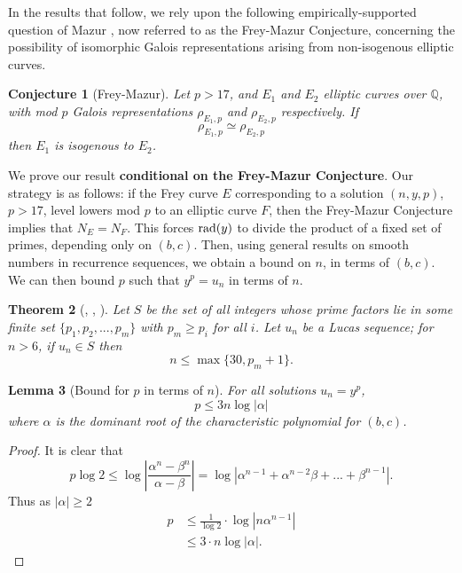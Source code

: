 \documentclass[12pt]{amsart}
\newtheorem{thm}{Theorem}[section]
\newtheorem{lem}[thm]{Lemma}
\newtheorem{conj}[thm]{Conjecture}
\theoremstyle{definition}
\def\Q{{\mathbb Q}}
\newcommand{\rad}{{\rm{rad}}}
\newcommand{\bfrac}[2]{\left| \frac{#1}{#2} \right|}
\begin{document}
In the results that follow, we rely upon the following empirically-supported question of Mazur \cite{mazur78}, now referred to as the Frey-Mazur Conjecture, concerning the possibility of isomorphic Galois representations arising from non-isogenous elliptic curves.

\begin{conj}[Frey-Mazur]\label{FreyMazur}
Let $p > 17$, and $E_1$ and $E_2$ elliptic curves over $\Q$, with mod $p$ Galois representations $\rho_{E_1,p}$ and $\rho_{E_2,p}$ respectively.  If
\[ \rho_{E_1,p} \simeq \rho_{E_2,p} \]
then $E_1$ is isogenous to $E_2$.
\end{conj}

We prove our result \textbf{conditional on the Frey-Mazur Conjecture}. Our strategy is as follows: if the Frey curve $E$ corresponding to a solution $(n,y,p)$, $p > 17$, level lowers mod $p$ to an elliptic curve $F$, then the Frey-Mazur Conjecture implies that $N_E = N_F$. This forces $\rad(y)$ to divide the product of a fixed set of primes, depending only on $(b,c)$. Then, using general results on smooth numbers in recurrence sequences, we obtain a bound on $n$, in terms of $(b,c)$. We can then bound $p$ such that $y^p = u_n$ in terms of $n$.


\begin{thm}[\cite{gyory81}, \cite{gyory82}, \cite{gyory03}]\label{smoothterm}
Let $S$ be the set of all integers whose prime factors lie in some finite set $\{p_1,p_2,...,p_m\}$ with $p_m \geq p_i$ for all $i$.  Let $u_n$ be a Lucas sequence; for $n > 6$, if $u_n \in S$ then
\[ n \leq \max\{30, p_m +1 \}. \]
\end{thm}

\begin{lem}[Bound for $p$ in terms of $n$]\label{boundpintermsn}
For all solutions $u_n = y^p$, 
\[ p \leq 3n \log|\alpha|  \]
where $\alpha$ is the dominant root of the characteristic polynomial for $(b,c)$.
\end{lem}

\begin{proof}
It is clear that
\[p\log{2} \leq \log \bfrac{\alpha^n - \beta^n}{\alpha-\beta}  = \log|\alpha^{n-1}+ \alpha^{n-2}\beta+...+\beta^{n-1}|. \]
Thus as $|\alpha| \geq 2$
\begin{align*}
p & \leq  \frac{1}{\log{2}} \cdot \log|n\alpha^{n-1}| \\
 & \leq 3\cdot n \log|\alpha|.
\end{align*}
\end{proof}
\end{document}
